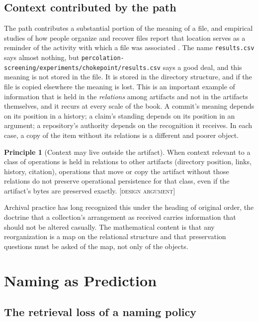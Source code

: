 \documentclass[11pt,twoside,openright]{book}
\theoremstyle{plain}
\theoremstyle{definition}
\newtheorem{principle}[theorem]{Principle}
\theoremstyle{remark}
\newcommand{\Design}{\textup{\textsc{[design argument]}}}
\begin{document}
\section{Context contributed by the path}

The path contributes a substantial portion of the meaning of a file, and empirical studies of how people organize and recover files report that location serves as a reminder of the activity with which a file was associated \cite{barreau1995}. The name \texttt{results.csv} says almost nothing, but \texttt{percolation-screening/\allowbreak experiments/\allowbreak chokepoint/\allowbreak results.csv} says a good deal, and this meaning is not stored in the file. It is stored in the directory structure, and if the file is copied elsewhere the meaning is lost. This is an important example of information that is held in the \emph{relations} among artifacts and not in the artifacts themselves, and it recurs at every scale of the book. A commit's meaning depends on its position in a history; a claim's standing depends on its position in an argument; a repository's authority depends on the recognition it receives. In each case, a copy of the item without its relations is a different and poorer object.

\begin{principle}[Context may live outside the artifact]\label{pr:outside}
When context relevant to a class of operations is held in relations to other artifacts (directory position, links, history, citation), operations that move or copy the artifact without those relations do not preserve operational persistence for that class, even if the artifact's bytes are preserved exactly.
\Design{}
\end{principle}

Archival practice has long recognized this under the heading of original order, the doctrine that a collection's arrangement as received carries information that should not be altered casually. The mathematical content is that any reorganization is a map on the relational structure and that preservation questions must be asked of the map, not only of the objects.

\chapter{Naming as Prediction}\label{ch:naming}

\section{The retrieval loss of a naming policy}
\end{document}
